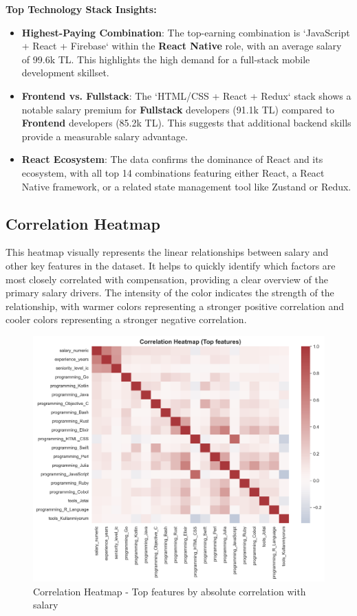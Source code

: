 \documentclass[12pt,a4paper]{article}
\begin{document}
\textbf{Top Technology Stack Insights:}
\begin{itemize}
	\item \textbf{Highest-Paying Combination}: The top-earning combination is `JavaScript + React + Firebase` within the \textbf{React Native} role, with an average salary of 99.6k TL. This highlights the high demand for a full-stack mobile development skillset.
	\item \textbf{Frontend vs. Fullstack}: The `HTML/CSS + React + Redux` stack shows a notable salary premium for \textbf{Fullstack} developers (91.1k TL) compared to \textbf{Frontend} developers (85.2k TL). This suggests that additional backend skills provide a measurable salary advantage.
	\item \textbf{React Ecosystem}: The data confirms the dominance of React and its ecosystem, with all top 14 combinations featuring either React, a React Native framework, or a related state management tool like Zustand or Redux.
\end{itemize}

\subsection{Correlation Heatmap}
This heatmap visually represents the linear relationships between salary and other key features in the dataset. It helps to quickly identify which factors are most closely correlated with compensation, providing a clear overview of the primary salary drivers. The intensity of the color indicates the strength of the relationship, with warmer colors representing a stronger positive correlation and cooler colors representing a stronger negative correlation.

\begin{figure}[H]
	\centering
	\includegraphics[width=\textwidth]{figures/heatmap_correlation.png}
	\caption{Correlation Heatmap - Top features by absolute correlation with salary}
\end{figure}
\end{document}
